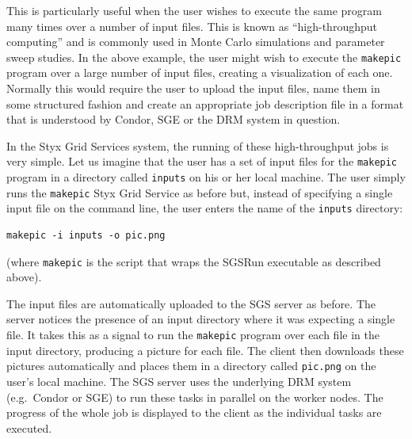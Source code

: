 \documentclass[times,10pt,twocolumn]{article}
\begin{document}
This is particularly useful when the user wishes to execute the same program many times over a number of input files.  This is known as ``high-throughput computing'' and is commonly used in Monte Carlo simulations and parameter sweep studies.  In the above example, the user might wish to execute the {\tt makepic} program over a large number of input files, creating a visualization of each one.  Normally this would require the user to upload the input files, name them in some structured fashion and create an appropriate job description file in a format that is understood by Condor, SGE or the DRM system in question.

In the Styx Grid Services system, the running of these high-throughput jobs is very simple.  Let us imagine that the user has a set of input files for the {\tt makepic} program in a directory called {\tt inputs} on his or her local machine.  The user simply runs the {\tt makepic} Styx Grid Service as before but, instead of specifying a single input file on the command line, the user enters the name of the {\tt inputs} directory:

\begin{verbatim}
makepic -i inputs -o pic.png
\end{verbatim}

\noindent (where {\tt makepic} is the script that wraps the SGSRun executable as described above).

The input files are automatically uploaded to the SGS server as before.  The server notices the presence of an input directory where it was expecting a single file.  It takes this as a signal to run the {\tt makepic} program over each file in the input directory, producing a picture for each file.  The client then downloads these pictures automatically and places them in a directory called {\tt pic.png} on the user's local machine.  The SGS server uses the underlying DRM system (e.g.\ Condor or SGE) to run these tasks in parallel on the worker nodes.  The progress of the whole job is displayed to the client as the individual tasks are executed.
\end{document}
